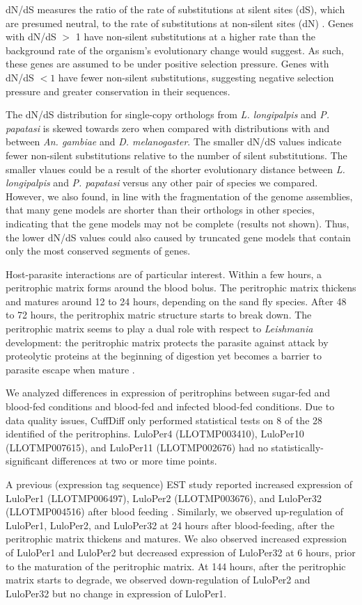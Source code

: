 dN/dS measures the ratio of the rate of substitutions at silent sites (dS), which are presumed neutral, to the rate of substitutions at non-silent sites (dN) \cite{Kryazhimskiy2008}. Genes with dN/dS $>$ 1 have non-silent substitutions at a higher rate than the background rate of the organism's evolutionary change would suggest.  As such, these genes are assumed to be under positive selection pressure.  Genes with dN/dS $<1$ have fewer non-silent substitutions, suggesting negative selection pressure and greater conservation in their sequences.

The dN/dS distribution for single-copy orthologs from \emph{L. longipalpis} and \emph{P. papatasi} is skewed towards zero when compared with distributions with and between \emph{An. gambiae} and \emph{D. melanogaster}.  The smaller dN/dS values indicate fewer non-silent substitutions relative to the number of silent substitutions.  The smaller vlaues could be a result of the shorter evolutionary distance between \emph{L. longipalpis} and \emph{P. papatasi} versus any other pair of species we compared.  However, we also found, in line with the fragmentation of the genome assemblies, that many gene models are shorter than their orthologs in other species, indicating that the gene models may not be complete (results not shown).  Thus, the lower dN/dS values could also caused by truncated gene models that contain only the most conserved segments of genes.

Host-parasite interactions are of particular interest.  Within a few hours, a peritrophic matrix forms around the blood bolus.  The peritrophic matrix thickens and matures around 12 to 24 hours, depending on the sand fly species.  After 48 to 72 hours, the peritrophix matric structure starts to break down.  The peritrophic matrix seems to play a dual role with respect to \emph{Leishmania} development: the peritrophic matrix protects the parasite against attack by proteolytic proteins at the beginning of digestion yet becomes a barrier to parasite escape when mature \cite{Dostalova2012}.

We analyzed differences in expression of peritrophins between sugar-fed and blood-fed conditions and blood-fed and infected blood-fed conditions.  Due to data quality issues, CuffDiff only performed statistical tests on 8 of the 28 identified of the peritrophins.  LuloPer4 (LLOTMP003410), LuloPer10 (LLOTMP007615), and LuloPer11 (LLOTMP002676) had no statistically-significant differences at two or more time points.

A previous (expression tag sequence) EST study reported increased expression of LuloPer1 (LLOTMP006497), LuloPer2 (LLOTMP003676), and LuloPer32 (LLOTMP004516) after blood feeding \cite{Jochim2008}. Similarly, we observed up-regulation of LuloPer1, LuloPer2, and LuloPer32 at 24 hours after blood-feeding, after the peritrophic matrix thickens and matures.  We also observed increased expression of LuloPer1 and LuloPer2 but decreased expression of LuloPer32 at 6 hours, prior to the maturation of the peritrophic matrix. At 144 hours, after the peritrophic matrix starts to degrade, we observed down-regulation of LuloPer2 and LuloPer32 but no change in expression of LuloPer1.

